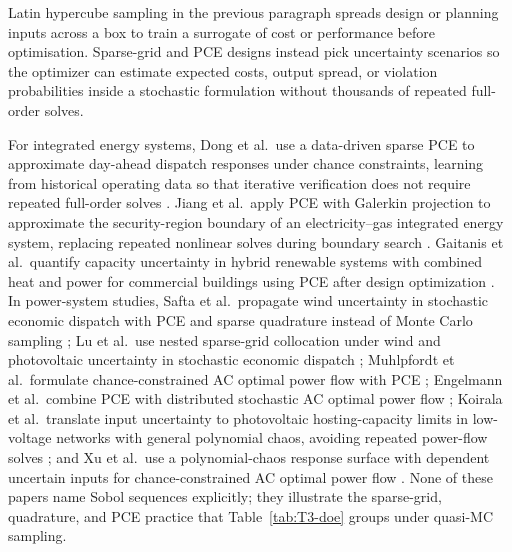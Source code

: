 Latin hypercube sampling in the previous paragraph spreads design
or planning inputs across a box to train a surrogate of cost or
performance before optimisation. Sparse-grid and PCE designs instead
pick uncertainty scenarios so the optimizer can estimate expected
costs, output spread, or violation probabilities inside a stochastic
formulation without thousands of repeated full-order solves.

For integrated energy systems, Dong et al.\ use a data-driven sparse PCE
to approximate day-ahead dispatch responses under chance constraints,
learning from historical operating data so that iterative verification
does not require repeated full-order solves \cite{Dong2023}. Jiang
et al.\ apply PCE with Galerkin projection to approximate the
security-region boundary of an electricity--gas integrated energy system,
replacing repeated nonlinear solves during boundary search
\cite{Jiang2026620}. Gaitanis et al.\ quantify capacity uncertainty in
hybrid renewable systems with combined heat and power for commercial
buildings using PCE after design optimization \cite{Gaitanis2026}. In
power-system studies, Safta et al.\ propagate wind uncertainty in
stochastic economic dispatch with PCE and sparse quadrature instead of
Monte Carlo sampling \cite{Safta20172535}; Lu et al.\ use nested
sparse-grid collocation under wind and photovoltaic uncertainty in
stochastic economic dispatch \cite{Lu201991827}; Muhlpfordt et al.\
formulate chance-constrained AC optimal power flow with PCE
\cite{Muhlpfordt20194806}; Engelmann et al.\ combine PCE with
distributed stochastic AC optimal power flow \cite{Engelmann20186188};
Koirala et al.\ translate input uncertainty to photovoltaic
hosting-capacity limits in low-voltage networks with general polynomial
chaos, avoiding repeated power-flow solves \cite{Koirala20242284}; and
Xu et al.\ use a polynomial-chaos response surface with dependent
uncertain inputs for chance-constrained AC optimal power flow
\cite{Xu20212696}. None of these papers name Sobol sequences explicitly;
they illustrate the sparse-grid, quadrature, and PCE practice that
Table~\ref{tab:T3-doe} groups under quasi-MC sampling.

